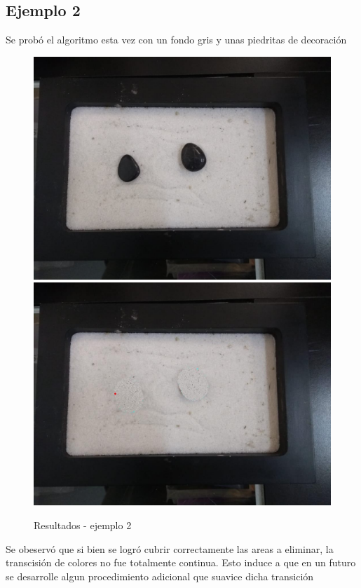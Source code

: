 \documentclass[conference]{IEEEtran}
\begin{document}
\subsection{Ejemplo 2}
Se probó el algoritmo esta vez con un fondo gris y unas piedritas de decoración
\begin{figure}[H]
\begin{centering}
\includegraphics[scale=0.11]{imagen.jpeg}
\includegraphics[scale=0.11]{imagen3320.jpeg}
\par\end{centering}
\caption{Resultados - ejemplo 2}
\end{figure}
Se obeservó que si bien se logró cubrir correctamente las areas a eliminar, la transcisión de colores no fue totalmente continua. Esto induce a que en un futuro se desarrolle algun procedimiento adicional que suavice dicha transición
\end{document}
